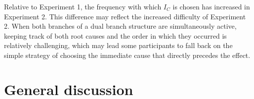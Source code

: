 \documentclass[10pt,letterpaper]{article}
\newcommand{\ev}[2]{$#1_#2$}
\begin{document}
Relative to Experiment 1, the frequency with which \ev{I}{C} is chosen has increased in Experiment 2. This difference may reflect the increased difficulty of Experiment 2. When both branches of a dual branch structure are simultaneously active, keeping track of both root causes and the order in which they occurred is relatively challenging, which may lead some participants to fall back on the simple strategy of choosing the immediate cause that directly precedes the effect.


\section{General discussion}
\end{document}
